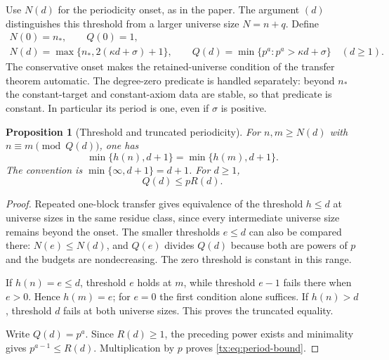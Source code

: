 \documentclass[11pt,a4paper,oneside,openany]{book}
\newtheorem{proposition}[theorem]{Proposition}
\theoremstyle{definition}\newtheorem{definition}[theorem]{Definition}
\theoremstyle{remark}\newtheorem{remark}[theorem]{Remark}
\numberwithin{equation}{chapter}
\begin{document}
Use $N(d)$ for the periodicity onset, as in the paper. The argument
$(d)$ distinguishes this threshold from a larger universe size
$N=n+q$. Define
\begin{equation}\label{tx:eq:NQ}
 \begin{gathered}
 N(0)=n_*,\qquad Q(0)=1,\\
 N(d)=\max\{n_*,2(\kappa d+\sigma)+1\},\qquad
 Q(d)=\min\{p^a:p^a>\kappa d+\sigma\}\quad(d\ge1).
 \end{gathered}
\end{equation}
The conservative onset makes the retained-universe condition of the
transfer theorem automatic. The degree-zero predicate is handled
separately: beyond $n_*$ the constant-target and constant-axiom data
are stable, so that predicate is constant. In particular its period
is one, even if $\sigma$ is positive.

\begin{proposition}[Threshold and truncated periodicity]\label{tx:thm:periodicity}
For $n,m\ge N(d)$ with $n\equiv m\pmod{Q(d)}$, one has
\begin{equation}\label{tx:eq:truncated-periodicity}
                     \min\{h(n),d+1\}=\min\{h(m),d+1\}.
\end{equation}
The convention is $\min\{\infty,d+1\}=d+1$. For $d\ge1$,
\begin{equation}\label{tx:eq:period-bound}
                              Q(d)\le pR(d).
\end{equation}
\end{proposition}
\begin{proof}
Repeated one-block transfer gives equivalence of the threshold
$h\le d$ at universe sizes in the same residue class, since every intermediate
universe size remains beyond the onset. The smaller thresholds $e\le d$
can also be compared there: $N(e)\le N(d)$, and $Q(e)$ divides $Q(d)$
because both are powers of $p$ and the budgets are nondecreasing.
The zero threshold is constant in this range.

If $h(n)=e\le d$, threshold $e$ holds at $m$, while threshold $e-1$
fails there when $e>0$. Hence $h(m)=e$; for $e=0$ the first condition
alone suffices. If $h(n)>d$, threshold $d$ fails at both universe sizes. This
proves the truncated equality.

Write $Q(d)=p^a$. Since $R(d)\ge1$, the preceding power exists and
minimality gives $p^{a-1}\le R(d)$. Multiplication by $p$ proves
\eqref{tx:eq:period-bound}.
\end{proof}
\end{document}
